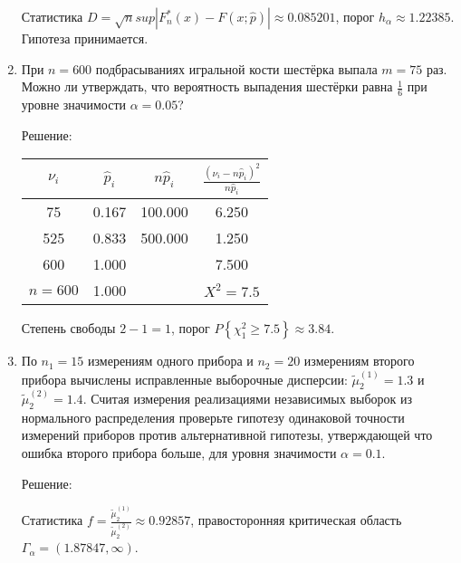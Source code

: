 \documentclass[a4paper,12pt]{article}
\newcommand{\probability}[1]{P \left\{ #1 \right\}}
\newcommand{\modulus}[1]{\left | #1 \right |}
\begin{document}
\begin{enumerate}
                  Статистика $D = \sqrt{n} sup \modulus{F_n^*(x) - F(x;\widehat{p})} \approx 0.085201$, порог $h_\alpha \approx 1.22385$.
                  Гипотеза принимается.

      \item \cite[246]{Efimov}

            При $n = 600$ подбрасываниях игральной кости шестёрка выпала $m = 75$ раз. Можно ли утверждать, что вероятность выпадения шестёрки равна
            $\frac{1}{6}$ при уровне значимости $\alpha = 0.05$?

            Решение: \par
                  \begin{tabular}{|c|c|c|c|}
                        \hline
                        $\nu_i$   & $\widehat{p}_i$ & $n \widehat{p}_i$ & $\frac{(\nu_i - n \widehat{p}_i)^2}{n \widehat{p}_i}$ \\
                        \hline
                        75        & 0.167           & 100.000           & 6.250                                                 \\
                        525       & 0.833           & 500.000           & 1.250                                                 \\
                        600       & 1.000           &                   & 7.500                                                 \\
                        \hline
                        $n = 600$ & 1.000           &                   & $X^2 = 7.5$                                           \\
                        \hline
                  \end{tabular}

                  Степень свободы $2 - 1 = 1$, порог $\probability{\chi_1^2 \ge 7.5} \approx 3.84$.

      \item По $n_1 = 15$ измерениям одного прибора и $n_2 = 20$ измерениям второго прибора вычислены исправленные выборочные дисперсии:
            $\widetilde{\mu}_2^{(1)} = 1.3$ и $\widetilde{\mu}_2^{(2)} = 1.4$. Считая измерения реализациями независимых выборок из нормального
            распределения проверьте гипотезу одинаковой точности измерений приборов против альтернативной гипотезы, утверждающей что ошибка второго
            прибора больше, для уровня значимости $\alpha = 0.1$.

            Решение: \par
                  Статистика $f = \frac{\widetilde{\mu}_2^{(1)}}{\widetilde{\mu}_2^{(2)}} \approx 0.92857$, правосторонняя критическая область
                  $\Gamma_\alpha = (1.87847, \infty)$.


\end{enumerate}
\end{document}
